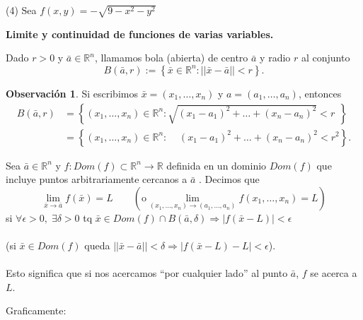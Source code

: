 \documentclass{article}
\theoremstyle{definition}
\newtheorem*{obs}{Observación}
\theoremstyle{remark}
\begin{document}
\textcolor{verdep2}{(4)} Sea $f(x,y)=-\sqrt{9-x^2-y^2}$ 
\begin{figure}[h]
\centering
\def\svgwidth{1\textwidth}

\end{figure} 
\begin{center}
\textbf{Limite y continuidad de funciones de varias variables.}
\end{center}
\begin{defi}
  Dado $r>0$ y $\bar{a} \in \mathbb{R}^n$, llamamos bola (abierta) de centro $\bar{a}$ y radio $r$ al conjunto \[ 
    B(\bar{a},r) := \left\{\bar{x} \in \mathbb{R}^n : || \bar{x} - \bar{a} || < r\right\}
  .\]
\end{defi}
\begin{obs}
  Si escribimos $\bar{x}=(x_1,\dots,x_n)$ y $a=(a_1,\dots, a_n)$, entonces \[
    \begin{array}{lllll}
      B(\bar{a},r)&=\left\{(x_1,\dots,x_n) \in \mathbb{R}^n : \sqrt{(x_1-a_1)^2+\dots + (x_n-a_n)^2}<r^{\phantom{2}}\right\}\\
                  &=\left\{(x_1,\dots,x_n)\in\mathbb{R}^n : \; \; \; \;  (x_1-a_1)^2+\dots+(x_n-a_n)^2 < r^2\right\}.
    \end{array}
  \]
\end{obs}
\begin{figure}[h]
\centering
\def\svgwidth{1\textwidth}

\end{figure} 
\begin{defi}[Límite] Sea $\bar{a} \in \mathbb{R}^n$ y $f : Dom(f) \subset \mathbb{R}^n \to \mathbb{R}$ definida en un dominio $Dom(f)$ que incluye puntos arbitrariamente cercanos a $\bar{a}$ . Decimos que \[ 
  \lim_{\bar{x} \to \bar{a}}{f(\bar{x})}=L \quad \quad \left(\text{o} \lim_{(x_1,\dots,x_n) \to (a_1, \dots ,a_n)}{f(x_1,\dots,x_n)}=L\right)
\]
\phantom{(}si $\forall \epsilon > 0,\; \exists \delta > 0$ \; tq \; $\bar{x} \in Dom(f) \cap B(\bar{a},\delta) \Rightarrow \big|f(\bar{x}-L) \big| < \epsilon$\\\\ \big(si $\bar{x} \in Dom(f)$ \; queda \; $||\bar{x}-\bar{a}|| < \delta \Rightarrow \big|f(\bar{x}-L)-L\big|<\epsilon$\big). \\\\ Esto significa que si nos acercamos ``por cualquier lado'' al punto $\bar{a}$, $f$ se acerca a $L$.
\end{defi}
Graficamente: 
\begin{figure}[h]
\centering
\def\svgwidth{0.55\textwidth}

\end{figure} \\
\end{document}
